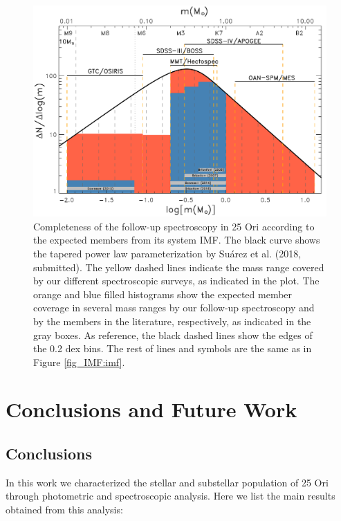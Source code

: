 \documentclass[12pt]{article}
\begin{document}
\begin{figure}[ht!]
	\includegraphics[width=1.0\textwidth]{survey_completeness.pdf}
	\caption[Completeness of the follow-up spectroscopy in 25 Ori.]{Completeness of the follow-up spectroscopy in 25 Ori according to the expected members from its system IMF. The black curve shows the tapered power law parameterization by Su\'arez et al. (2018, submitted). The yellow dashed lines indicate the mass range covered by our different spectroscopic surveys, as indicated in the plot. The orange and blue filled histograms show the expected member coverage in several mass ranges by our follow-up spectroscopy and by the members in the literature, respectively, as indicated in the gray boxes. As reference, the black dashed lines show the edges of the 0.2 dex bins. The rest of lines and symbols are the same as in Figure \ref{fig_IMF:imf}.}
	\label{fig:completeness}
\end{figure}

\newpage
\section{Conclusions and Future Work}
\label{sec:conclusions}

\subsection{Conclusions}
In this work we characterized the stellar and substellar population of 25 Ori through photometric and spectroscopic analysis. Here we list the main results obtained from this analysis:\\
\end{document}
